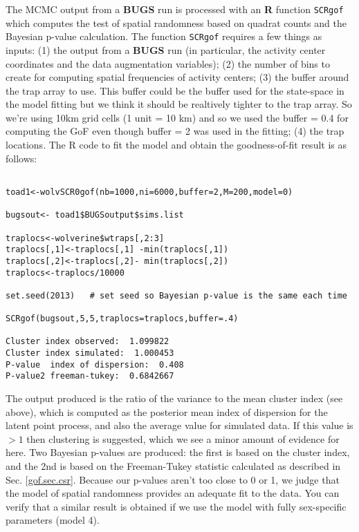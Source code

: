 The MCMC output from a {\bf BUGS} run is processed with  an {\bf R} function
\mbox{\tt SCRgof} which
computes the test of spatial randomness based on quadrat counts and the
Bayesian p-value calculation. The function \mbox{\tt SCRgof} requires
 a few things as inputs: (1) the output from a
{\bf BUGS} run (in particular, the activity center coordinates and the
data augmentation variables); (2) the number of bins to create for
computing spatial frequencies of activity centers;  (3) the buffer
around the trap array to use.  This buffer could be the buffer used
for the state-space in the model fitting but we think it should be
realtively tighter to the trap array. So we're using 10km grid cells
(1 unit = 10 km) and so we used the buffer = 0.4 for computing the GoF
even though buffer = 2 was used in the fitting;  (4) the trap
locations.  The R code to fit the model and obtain the goodness-of-fit
result is as follows:
\begin{verbatim}

toad1<-wolvSCR0gof(nb=1000,ni=6000,buffer=2,M=200,model=0)

bugsout<- toad1$BUGSoutput$sims.list

traplocs<-wolverine$wtraps[,2:3]
traplocs[,1]<-traplocs[,1] -min(traplocs[,1])
traplocs[,2]<-traplocs[,2]- min(traplocs[,2])
traplocs<-traplocs/10000

set.seed(2013)   # set seed so Bayesian p-value is the same each time

SCRgof(bugsout,5,5,traplocs=traplocs,buffer=.4)

Cluster index observed:  1.099822
Cluster index simulated:  1.000453
P-value  index of dispersion:  0.408
P-value2 freeman-tukey:  0.6842667
\end{verbatim}
The output produced is the ratio of the variance to the mean cluster
index (see above), which is computed as the posterior mean index of
dispersion for the latent point process, and also the average value
for simulated data. If this value is $>1$ then clustering is
suggested, which we see a minor amount of evidence for here. Two
Bayesian p-values are produced: the first is based on the cluster
index, and the 2nd is based on the Freeman-Tukey statistic calculated
as described in Sec. \ref{gof.sec.csr}.  Because our p-values aren't
too close to 0 or 1, we judge that the model of spatial randomness
provides an adequate fit to the data. You can verify that a similar result is obtained if
we use the model with fully sex-specific parameters (model 4).

